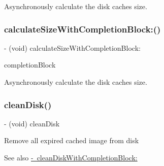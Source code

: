 Asynchronously calculate the disk cache\textquotesingle{}s size. \mbox{\label{interface_s_d_image_cache_a276a37cdab08d116906f65040bad9c99}} 
\subsubsection{\texorpdfstring{calculate\+Size\+With\+Completion\+Block\+:()}{calculateSizeWithCompletionBlock:()}\hspace{0.1cm}{\footnotesize\ttfamily [3/3]}}
{\footnotesize\ttfamily -\/ (void) calculate\+Size\+With\+Completion\+Block\+: \begin{DoxyParamCaption}\item[{(S\+D\+Web\+Image\+Calculate\+Size\+Block)}]{completion\+Block }\end{DoxyParamCaption}}

Asynchronously calculate the disk cache\textquotesingle{}s size. \mbox{\label{interface_s_d_image_cache_a491f75cc5c1df37dce478c00f898a0d8}} 
\subsubsection{\texorpdfstring{clean\+Disk()}{cleanDisk()}\hspace{0.1cm}{\footnotesize\ttfamily [1/3]}}
{\footnotesize\ttfamily -\/ (void) clean\+Disk \begin{DoxyParamCaption}{ }\end{DoxyParamCaption}}

Remove all expired cached image from disk \begin{DoxySeeAlso}{See also}
\mbox{\hyperlink{interface_s_d_image_cache_a1f82c522f4cb0fafdb063291cbcb23d0}{-\/ clean\+Disk\+With\+Completion\+Block\+:}} 
\end{DoxySeeAlso}
\mbox{\label{interface_s_d_image_cache_a491f75cc5c1df37dce478c00f898a0d8}} 

